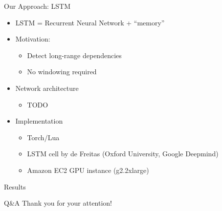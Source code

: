 \documentclass{beamer}
\begin{document}
\begin{frame}{Our Approach: LSTM}
    \begin{itemize}
        \item
            LSTM = Recurrent Neural Network + ``memory''
        \item
            Motivation:
            \begin{itemize}
            \item
                Detect long-range dependencies
            \item
                No windowing required
            \end{itemize}
        \item
            Network architecture
            \begin{itemize}
                \item TODO
            \end{itemize}
        \item
            Implementation
            \begin{itemize}
                \item
                    Torch/Lua
                \item
                    LSTM cell by
                    de Freitas (Oxford University, Google Deepmind)
                \item
                    Amazon EC2 GPU instance (g2.2xlarge)
            \end{itemize}
    \end{itemize}
\end{frame}

\begin{frame}{Results}
\end{frame}

\begin{frame}{Q\&A}
    \Large
    \centering
    Thank you for your attention!
\end{frame}
\end{document}

